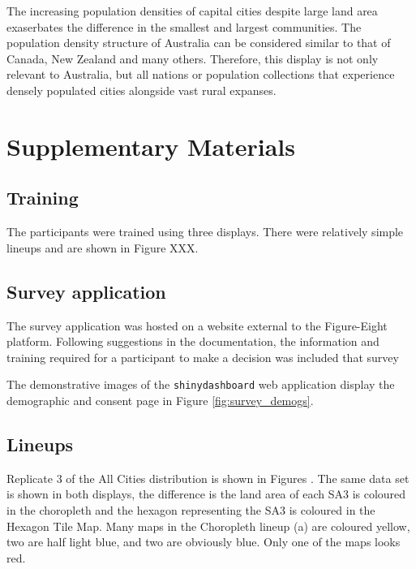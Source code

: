 \documentclass[conference,final,]{IEEEtran}
\begin{document}
The increasing population densities of capital cities despite large land area exaserbates the difference in the smallest and largest communities.
The population density structure of Australia can be considered similar to that of Canada, New Zealand and many others. Therefore, this display is not only relevant to Australia, but all nations or population collections that experience densely populated cities alongside vast rural expanses.

\newpage

\hypertarget{supplementary-materials}{%
\section{Supplementary Materials}\label{supplementary-materials}}

\hypertarget{training}{%
\subsection{Training}\label{training}}

The participants were trained using three displays. There were relatively simple lineups and are shown in Figure XXX.

\hypertarget{survey-application}{%
\subsection{Survey application}\label{survey-application}}

The survey application was hosted on a website external to the Figure-Eight platform. Following suggestions in the documentation, the information and training required for a participant to make a decision was included that survey

The demonstrative images of the \texttt{shinydashboard} web application display the demographic and consent page in Figure
\ref{fig:survey_demogs}.

\hypertarget{lineups}{%
\subsection{Lineups}\label{lineups}}

Replicate 3 of the All Cities distribution is shown in Figures . The same data set is shown in both displays, the difference is the land area of each SA3 is coloured in the choropleth and the hexagon representing the SA3 is coloured in the Hexagon Tile Map. Many maps in the Choropleth lineup (a) are coloured yellow, two are half light blue, and two are obviously blue. Only one of the maps looks red.
\end{document}
